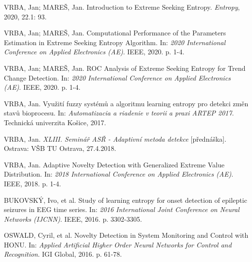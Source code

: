 \documentclass[11pt,twoside,openright]{report}
\begin{document}








%




\renewcommand{\bibname}{Publikace autora}
\begin{thebibliography}{A}
\end{thebibliography}

\begin{enumerate}[label={[V\arabic*]}]
    \item \label{ese_mdpi} VRBA, Jan; MAREŠ, Jan. Introduction to Extreme Seeking Entropy. \textit{Entropy}, 2020, 22.1: 93.
  	\item \label{appel2}VRBA, Jan; MAREŠ, Jan. Computational Performance of the Parameters Estimation in Extreme Seeking Entropy Algorithm. In: \textit{2020 International Conference on Applied Electronics (AE)}. IEEE, 2020. p. 1-4.
	\item \label{appel3}VRBA, Jan; MAREŠ, Jan. ROC Analysis of Extreme Seeking Entropy for Trend Change Detection. In: \textit{2020 International Conference on Applied Electronics (AE)}. IEEE, 2020. p. 1-4.  
	\item \label{artep}VRBA, Jan. Využití fuzzy systémů a algoritmu learning entropy pro detekci změn stavů bioprocesu. In: \textit{Automatizacia a riadenie v teorii a praxi ARTEP 2017}. Technická univerzita Košice, 2017.

	\item \label{asr} VRBA, Jan. \textit{XLIII. Seminář ASŘ - Adaptivní metoda detekce} [přednáška]. Ostrava: VŠB TU Ostrava, 27.4.2018.
    \item \label{appel1}VRBA, Jan. Adaptive Novelty Detection with Generalized Extreme Value Distribution. In: \textit{2018 International Conference on Applied Electronics (AE)}. IEEE, 2018. p. 1-4.
    \item \label{ijcnn}BUKOVSKÝ, Ivo, et al. Study of learning entropy for onset detection of epileptic seizures in EEG time series. In: \textit{2016 International Joint Conference on Neural Networks (IJCNN)}. IEEE, 2016. p. 3302-3305.

    
    \item \label{cyril}OSWALD, Cyril, et al. Novelty Detection in System Monitoring and Control with HONU. In: \textit{Applied Artificial Higher Order Neural Networks for Control and Recognition}. IGI Global, 2016. p. 61-78.



\end{enumerate}
\end{document}
